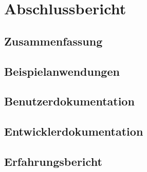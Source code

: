 
\newpage

\chapter{Abschlussbericht} %
\label{cha:abschlussbericht}

\section{Zusammenfassung}
\label{sec:zusammenfassung}

\section{Beispielanwendungen}
\label{sec:beispielanwendungen}

\section{Benutzerdokumentation}
\label{sec:benutzerdokumentation}

\section{Entwicklerdokumentation}
\label{sec:entwicklerdokumentation}

\section{Erfahrungsbericht}
\label{sec:erfahrungsbericht}